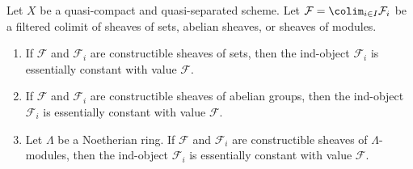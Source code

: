 \begin{lemma}
\label{lemma-colimit-constructible}
Let $X$ be a quasi-compact and quasi-separated scheme. Let
$\mathcal{F} = \colim_{i \in I} \mathcal{F}_i$ be a filtered
colimit of sheaves of sets, abelian sheaves, or sheaves of modules.
\begin{enumerate}
\item If $\mathcal{F}$ and $\mathcal{F}_i$ are constructible sheaves of
sets, then the ind-object $\mathcal{F}_i$ is essentially constant with
value $\mathcal{F}$.
\item If $\mathcal{F}$ and $\mathcal{F}_i$ are constructible sheaves of
abelian groups, then the ind-object $\mathcal{F}_i$ is essentially constant
with value $\mathcal{F}$.
\item Let $\Lambda$ be a Noetherian ring.
If $\mathcal{F}$ and $\mathcal{F}_i$ are constructible sheaves of
$\Lambda$-modules, then the ind-object $\mathcal{F}_i$ is essentially constant
with value $\mathcal{F}$.
\end{enumerate}
\end{lemma}

